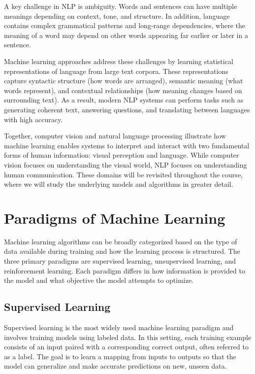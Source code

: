 \documentclass{article}
\begin{document}
A key challenge in NLP is ambiguity. Words and sentences can have multiple meanings depending on context, tone, and structure. In addition, language contains complex grammatical patterns and long-range dependencies, where the meaning of a word may depend on other words appearing far earlier or later in a sentence.

Machine learning approaches address these challenges by learning statistical representations of language from large text corpora. These representations capture syntactic structure (how words are arranged), semantic meaning (what words represent), and contextual relationships (how meaning changes based on surrounding text). As a result, modern NLP systems can perform tasks such as generating coherent text, answering questions, and translating between languages with high accuracy.

Together, computer vision and natural language processing illustrate how machine learning enables systems to interpret and interact with two fundamental forms of human information: visual perception and language. While computer vision focuses on understanding the visual world, NLP focuses on understanding human communication. These domains will be revisited throughout the course, where we will study the underlying models and algorithms in greater detail.

\section{Paradigms of Machine Learning}

Machine learning algorithms can be broadly categorized based on the type of data available during training and how the learning process is structured. The three primary paradigms are supervised learning, unsupervised learning, and reinforcement learning. Each paradigm differs in how information is provided to the model and what objective the model attempts to optimize.

\subsection{Supervised Learning}

Supervised learning is the most widely used machine learning paradigm and involves training models using labeled data. In this setting, each training example consists of an input paired with a corresponding correct output, often referred to as a label. The goal is to learn a mapping from inputs to outputs so that the model can generalize and make accurate predictions on new, unseen data.
\end{document}
